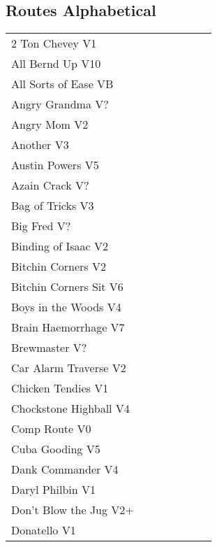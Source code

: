 \twocolumn
{}
\begin{flushleft}
\section{Routes Alphabetical}
\begin{center}
\begin{supertabular}{p{0.65\linewidth}r}
2 Ton Chevey V1 & \pageref{rt:2 Ton Chevey} \\
All Bernd Up V10 & \pageref{rt:All Bernd Up} \\
All Sorts of Ease VB & \pageref{rt:All Sorts of Ease} \\
Angry Grandma V? & \pageref{rt:Angry Grandma} \\
Angry Mom V2 & \pageref{rt:Angry Mom} \\
Another V3 & \pageref{rt:Another} \\
Austin Powers V5 & \pageref{rt:Austin Powers} \\
Azain Crack V? & \pageref{rt:Azain Crack} \\
Bag of Tricks V3 & \pageref{vr:Bag of Tricks} \\
Big Fred V? & \pageref{rt:Big Fred} \\
Binding of Isaac V2 & \pageref{rt:Binding of Isaac} \\
Bitchin Corners V2 & \pageref{rt:Bitchin Corners} \\
Bitchin Corners Sit V6 & \pageref{vr:Bitchin Corners Sit} \\
Boys in the Woods V4 & \pageref{rt:Boys in the Woods} \\
Brain Haemorrhage V7 & \pageref{vr:Brain Haemorrhage} \\
Brewmaster V? & \pageref{rt:Brewmaster} \\
Car Alarm Traverse V2 & \pageref{rt:Car Alarm Traverse} \\
Chicken Tendies V1 & \pageref{rt:Chicken Tendies} \\
Chockstone Highball V4 & \pageref{rt:Chockstone Highball} \\
Comp Route V0 & \pageref{rt:Comp Route} \\
Cuba Gooding V5 & \pageref{rt:Cuba Gooding} \\
Dank Commander V4 & \pageref{rt:Dank Commander} \\
Daryl Philbin V1 & \pageref{rt:Daryl Philbin} \\
Don't Blow the Jug V2+ & \pageref{rt:Don't Blow the Jug} \\
Donatello V1 & \pageref{rt:Donatello} \\

\end{supertabular}
\end{center}
\end{flushleft}
